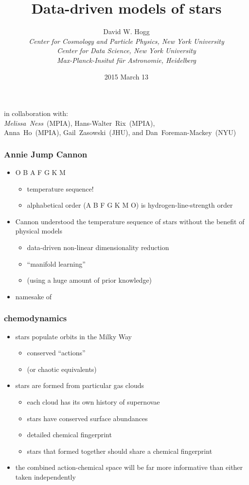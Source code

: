 \documentclass[pdftex]{beamer}
\title{Data-driven models of stars}
\author[David W. Hogg (NYU)]{David W. Hogg \\
  \textsl{\small Center for Cosmology and Particle Physics,
                 New York University} \\
  \textsl{\small Center for Data Science,
                 New York University} \\
  \textsl{\small Max-Planck-Insitut f\"ur Astronomie, Heidelberg}}
\date{2015 March 13}
\newcommand{\teff}{T_{\mathrm{eff}}}
\newcommand{\logg}{\log g}
\newcommand{\feh}{[\mathrm{Fe / H}]}
\newcommand{\conclusions}{%
\begin{frame}
  \frametitle{conclusions}
  \begin{itemize}
  \item A data-driven label transfer system provides \apogee\ stars with labels comparable in quality to the \apogee\ physics-driven pipeline.
    \begin{itemize}
    \item \tc\ (Ness \etal, \textit{ApJ} submitted)
    \item ``labels'' $\equiv (\teff,\logg,\feh)$
    \end{itemize}
  \item \tc\ uses \emph{no physical model of stars}.
  \item The method and the training set are both immature zeroth steps.
  \item There is hope for a consistent system of stellar parameters and chemical abundances across all future surveys.
    \begin{itemize}
    \item \gaia\ \& \project{Gaia-ESO}
    \item \sdssiii\ \project{SEGUE} \& \apogee; \sdssiv\ \project{APOGEE-2}
    \item \project{HERMES} / \project{GALAH}
    \end{itemize}
  \item \texttt{\giturl}
  \end{itemize}
\end{frame}}
\begin{document}
\begin{frame}
  \titlepage
  in collaboration with:\\
  \emph{Melissa~Ness}~(MPIA), {\small Hans-Walter~Rix~(MPIA), \\
  Anna~Ho~(MPIA), Gail~Zasowski~(JHU), and Dan~Foreman-Mackey~(NYU)}
\end{frame}


\begin{frame}
  \frametitle{Annie Jump Cannon}
  \begin{itemize}
  \item O B A F G K M
    \begin{itemize}
    \item temperature sequence!
    \item alphabetical order (A B F G K M O) is hydrogen-line-strength order
    \end{itemize}
  \item Cannon understood the temperature sequence of stars without the benefit of physical models
    \begin{itemize}
    \item data-driven non-linear dimensionality reduction
    \item ``manifold learning''
    \item (using a huge amount of prior knowledge)
    \end{itemize}
  \item namesake of \tc
  \end{itemize}
\end{frame}

\begin{frame}
  \frametitle{chemodynamics}
  \begin{itemize}
  \item stars populate orbits in the Milky Way
    \begin{itemize}
    \item conserved ``actions''
    \item (or chaotic equivalents)
    \end{itemize}
  \item stars are formed from particular gas clouds
    \begin{itemize}
    \item each cloud has its own history of supernovae
    \item stars have conserved surface abundances
    \item detailed chemical fingerprint
    \item stars that formed together should share a chemical fingerprint
    \end{itemize}
  \item the combined action-chemical space will be far more
    informative than either taken independently
  \end{itemize}
\end{frame}
\end{document}
